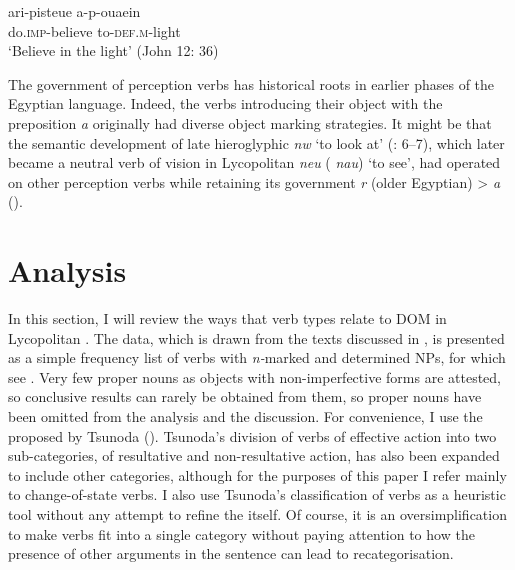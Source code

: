 \documentclass[output=paper]{LSP/langsci}
\begin{document}
\begin{exe}
\ex \label{06-en:ex:18}
\gll ari-pisteue 		a-p-ou{\ob}aein{\cb}\\
 do.\textsc{imp-}believe to-\textsc{def.m-}light\\
\glt ‘Believe in the light’ (John 12: 36)
\end{exe}

The government of perception verbs has historical roots in earlier phases of the Egyptian language. Indeed, the  verbs introducing their object with the preposition \textit{a} originally had diverse object marking strategies. It might be that the semantic development of late hieroglyphic \textit{nw} ‘to look at’ (\citealt{Depuydt1988Verben}: 6–7), which later became a neutral verb of vision in Lycopolitan \textit{neu} ( \textit{nau}) ‘to see’, had operated on other perception verbs while retaining its government \textit{r} (older Egyptian) > \textit{a} ().

\largerpage
\section{Analysis}
\label{06-en-sec:5}

In this section, I will review the ways that verb types relate to DOM in Lycopolitan . The data, which is drawn from the texts discussed in , is presented as a simple frequency list of verbs with \textit{n-}marked and determined NPs, for which see . Very few proper nouns as objects with non-imperfective forms are attested, so conclusive results can rarely be obtained from them, so proper nouns have been omitted from the analysis and the discussion. For convenience, I use the  proposed by Tsunoda (). Tsunoda’s division of verbs of effective action into two sub-categories, of resultative and non-resultative action, has also been expanded to include other categories, although for the purposes of this paper I refer mainly to change-of-state verbs. I also use Tsunoda’s classification of verbs as a heuristic tool without any attempt to refine the  itself. Of course, it is an oversimplification to make verbs fit into a single category without paying attention to how the presence of other arguments in the sentence can lead to recategorisation. 
\end{document}
